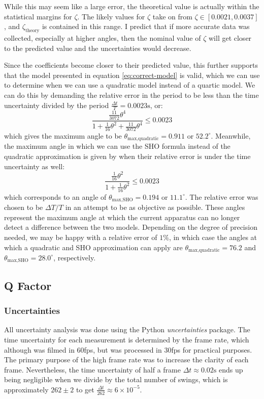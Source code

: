 \documentclass[%
 reprint,
 amsmath,amssymb
 aps,
]{revtex4-2}
\begin{document}
While this may seem like a large error, the theoretical value is actually within the statistical margins for $\zeta$. The likely values for $\zeta$ take on from $\zeta \in [0.0021,0.0037]$, and $\zeta_\text{theory}$ is contained in this range. I predict that if more accurate data was collected, especially at higher angles, then the nominal value of $\zeta$ will get closer to the predicted value and the uncertainties would decrease.

Since the coefficients become closer to their predicted value, this further supports that the model presented in equation \ref{eq:correct-model} is valid, which we can use to determine when we can use a quadratic model instead of a quartic model. We can do this by demanding the relative error in the period to be less than the time uncertainty divided by the period $\frac{\Delta t}{T} = 0.0023\si{\second}$, or:
\begin{equation}
    \frac{\frac{11}{3072}\theta^{4}}{1+\frac{1}{16}\theta^{2}+\frac{11}{3072}\theta^{4}} \le 0.0023
    \label{eq:}
\end{equation}
which gives the maximum angle to be $\theta_\text{max,quadratic}=0.911$ or $52.2^\circ$. Meanwhile, the maximum angle in which we can use the SHO formula instead of the quadratic approximation is given by when their relative error is under the time uncertainty as well:
\begin{equation}
    \frac{\frac{1}{16}\theta^{2}}{1+\frac{1}{16}\theta^{2}} \le 0.0023
    \label{eq:}
\end{equation}
which corresponds to an angle of $\theta_\text{max,SHO}=0.194$ or $11.1^\circ$. The relative error was chosen to be $\Delta T/T$ in an attempt to be as objective as possible. These angles represent the maximum angle at which the current apparatus can no longer detect a difference between the two models. Depending on the degree of precision needed, we may be happy with a relative error of $1\%$, in which case the angles at which a quadratic and SHO approximation can apply are $\theta_\text{max,quadratic}=76.2$ and $\theta_\text{max,SHO}=28.0^\circ$, respectively.
\subsection{Q Factor}
\subsubsection{Uncertainties}
All uncertainty analysis was done using the Python \textit{uncertainties} package\cite{uncertainties}. The time uncertainty for each measurement is determined by the frame rate, which although was filmed in 60fps, but was processed in 30fps for practical purposes. The primary purpose of the high frame rate was to increase the clarity of each frame. Nevertheless, the time uncertainty of half a frame $\Delta t \approx 0.02\si{\second}$ ends up being negligible when we divide by the total number of swings, which is approximately $262\pm 2$ to get $\frac{\Delta t}{262}\approx 6 \times 10^{-5}$.
\end{document}

